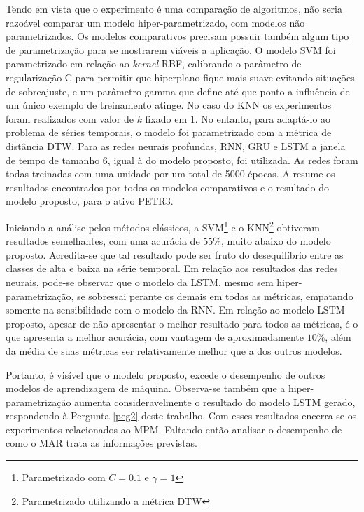 Tendo em vista que o experimento é uma comparação de algoritmos, não seria razoável comparar um modelo hiper-parametrizado, com modelos não parametrizados. Os modelos comparativos precisam possuir também algum tipo de parametrização para se mostrarem viáveis a aplicação. O modelo \acrshort{SVM} foi parametrizado em relação ao \emph{kernel} RBF, calibrando o parâmetro de regularização C para permitir que hiperplano fique mais suave evitando situações de sobreajuste, e um parâmetro gamma que define até que ponto a influência de um único exemplo de treinamento atinge. No caso do \acrshort{KNN} os experimentos foram realizados com valor de $k$ fixado em 1. No entanto, para adaptá-lo ao problema de séries temporais, o modelo foi parametrizado com a métrica de distância \acrfull{DTW}. Para as redes neurais profundas, \acrshort{RNN}, \acrshort{GRU} e \acrshort{LSTM} a janela de tempo de tamanho $6$, igual à do modelo proposto, foi utilizada. As redes foram todas treinadas com uma unidade por um total de 5000 épocas. A  resume os resultados encontrados por todos os modelos comparativos e o resultado do modelo proposto, para o ativo PETR3.



Iniciando a análise pelos métodos clássicos, a \acrshort{SVM}\footnote{Parametrizado com $C = 0.1$ e $\gamma = 1$} e o \acrshort{KNN}\footnote{Parametrizado utilizando a métrica \acrshort{DTW}} obtiveram resultados semelhantes, com uma acurácia de $55\%$, muito abaixo do modelo proposto. Acredita-se que tal resultado pode ser fruto do desequilíbrio entre as classes de alta e baixa na série temporal. Em relação aos resultados das redes neurais, pode-se observar que o modelo da \acrshort{LSTM}, mesmo sem hiper-parametrização, se sobressai perante os demais em todas as métricas, empatando somente na sensibilidade com o modelo da \acrshort{RNN}. Em relação ao modelo \acrshort{LSTM} proposto, apesar de não apresentar o melhor resultado para todos as métricas, é o que apresenta a melhor acurácia, com vantagem de aproximadamente $10\%$, além da média de suas métricas ser relativamente melhor que a dos outros modelos.

Portanto, é visível que o modelo proposto, excede o desempenho de outros modelos de aprendizagem de máquina. Observa-se também que a hiper-parametrização aumenta consideravelmente o resultado do modelo \acrshort{LSTM} gerado, respondendo à Pergunta \ref{peg2} deste trabalho. Com esses resultados encerra-se os experimentos relacionados ao \acrshort{MPM}. Faltando então analisar o desempenho de como o \acrshort{MAR} trata as informações previstas.

